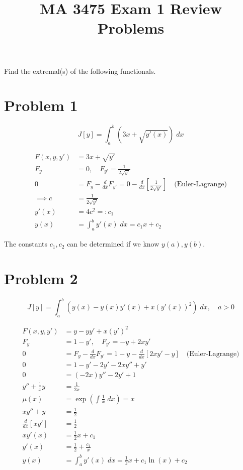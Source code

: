 \documentclass[a4paper]{article}
\title{MA 3475 Exam 1 Review Problems}
\begin{document}
\maketitle
Find the extremal(s) of the following functionals.

\section*{Problem 1}
$$J[y] = \int_a^b \left(3x + \sqrt{y'(x)}\right) \; dx $$

\begin{align*}
F(x,y,y') &= 3x + \sqrt{y'} \\
F_y &= 0, \quad F_{y'} = \frac{1}{2\sqrt{y'}} \\
0 &= F_y - \frac{d}{dx}F_{y'} = 0 - \frac{d}{dx}\left[\frac{1}{2\sqrt{y'}}\right] \quad \text{(Euler-Lagrange)} \\
\implies c &= \frac{1}{2\sqrt{y'}} \\
y'(x) &= 4c^2 =: c_1  \\
y(x) &= \int_a^b y'(x) \; dx = c_1x + c_2
\end{align*}

The constants $c_1,c_2$ can be determined if we know $y(a),y(b)$.
\section*{Problem 2}

$$J[y] = \int_a^b \left(y(x) - y(x)y'(x) + x(y'(x))^2\right) \; dx,\quad a > 0 $$

\begin{align*}
F(x,y,y') &= y-yy' + x(y')^2 \\
F_y &= 1-y', \quad F_{y'} = -y + 2xy' \\
0 &= F_y - \frac{d}{dx}F_{y'} = 1-y - \frac{d}{dx}\left[2xy' - y\right] \quad \text{(Euler-Lagrange)}\\
0&= 1-y' -2y' - 2xy'' + y' \\
0&= (-2x)y'' -2y' + 1 \\
y'' + \frac{1}{x}y &= \frac{1}{2x} \\
\mu(x) &= \exp\left(\int \frac{1}{x} \; dx \right) = x \\
xy'' + y &= \frac{1}{2} \\
\frac{d}{dx}\left[xy'\right] &= \frac{1}{2}\\
xy'(x) &= \frac{1}{2}x + c_1 \\
y'(x) &= \frac{1}{2} + \frac{c_1}{x} \\
y(x) &= \int_a^b y'(x) \; dx = \frac{1}{2}x + c_1\ln(x) + c_2
\end{align*}
\end{document}
